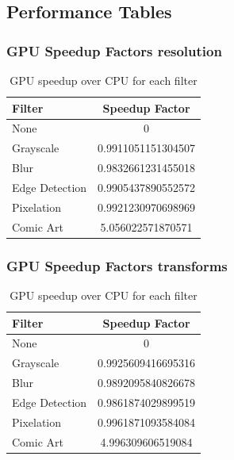 \documentclass[12pt,a4paper]{article}
\begin{document}

\subsection{Performance Tables}

\subsubsection{GPU Speedup Factors resolution}
\begin{table}[H]
    \centering
    \caption{GPU speedup over CPU for each filter}
    \label{tab:speedup}
    \begin{tabular}{lc}
        \toprule
        Filter & Speedup Factor \\
        \midrule
        None & 0 \\
        Grayscale & 0.9911051151304507 \\
        Blur & 0.9832661231455018 \\
        Edge Detection & 0.9905437890552572 \\
        Pixelation & 0.9921230970698969 \\
        Comic Art & 5.056022571870571 \\
        \bottomrule
    \end{tabular}
\end{table}

\subsubsection{GPU Speedup Factors transforms}
\begin{table}[H]
    \centering
    \caption{GPU speedup over CPU for each filter}
    \label{tab:speedup}
    \begin{tabular}{lc}
        \toprule
        Filter & Speedup Factor \\
        \midrule
        None & 0 \\
        Grayscale & 0.9925609416695316 \\
        Blur & 0.9892095840826678 \\
        Edge Detection & 0.9861874029899519 \\
        Pixelation & 0.9961871093584084 \\
        Comic Art & 4.996309606519084 \\
        \bottomrule
    \end{tabular}
\end{table}
\end{document}
